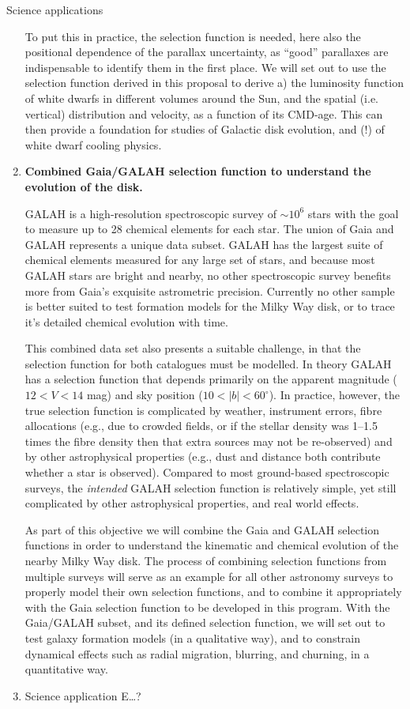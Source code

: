 \begin{workpackage}{Science applications}
\begin{wpobjectives}
\begin{enumerate}
{      To put this in practice, the selection function is needed, here also the positional dependence of the parallax uncertainty, as ``good'' parallaxes are indispensable to identify them in the first place. We will set out to use the selection function derived in this proposal to derive a) the luminosity function of white dwarfs in different volumes around the Sun, and the spatial (i.e. vertical) distribution and velocity, as a function of its CMD-age. This can then provide a foundation for studies of Galactic disk evolution, and (!) of white dwarf cooling physics.
      }
      \item \textbf{Combined Gaia/GALAH selection function to understand the evolution of the disk.} 
      {GALAH is a high-resolution spectroscopic survey of $\sim10^6$ stars with the goal to measure up to 28 chemical elements for each star. The union of Gaia and GALAH represents a unique data subset. GALAH has the largest suite of chemical elements measured for any large set of stars, and because most GALAH stars are bright and nearby, no other spectroscopic survey benefits more from Gaia's exquisite astrometric precision. Currently no other sample is better suited to test formation models for the Milky Way disk, or to trace it's detailed chemical evolution with time.
      
      This combined data set also presents a suitable challenge, in that the selection function for both catalogues must be modelled. In theory GALAH has a selection function that depends primarily on the apparent magnitude ($12 < V <14$ mag) and sky position ($10 < |b| < 60^\circ$). In practice, however, the true selection function is complicated by weather, instrument errors, fibre allocations (e.g., due to crowded fields, or if the stellar density was 1--1.5 times the fibre density then that extra sources may not be re-observed) and by other astrophysical properties (e.g., dust and distance both contribute whether a star is observed). Compared to most ground-based spectroscopic surveys, the \emph{intended} GALAH selection function is relatively simple, yet still complicated by other astrophysical properties, and real world effects.
      
      As part of this objective we will combine the Gaia and GALAH selection functions in order to understand the kinematic and chemical evolution of the nearby Milky Way disk. The process of combining selection functions from multiple surveys will serve as an example for all other astronomy surveys to properly model their own selection functions, and to combine it appropriately with the Gaia selection function to be developed in this program. With the Gaia/GALAH subset, and its defined selection function, we will set out to test galaxy formation models (in a qualitative way), and to constrain dynamical effects such as radial migration, blurring, and churning, in a quantitative way.}
      \item Science application E\ldots?
    \end{enumerate}
  \end{wpobjectives}


\end{workpackage}
